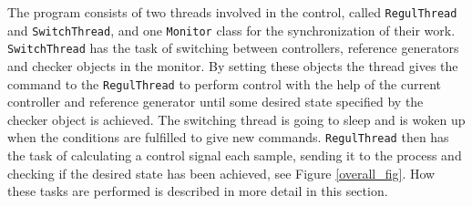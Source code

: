 


The program consists of two threads involved in the control, called \texttt{RegulThread} and \texttt{SwitchThread}, and one \texttt{Monitor} class for the synchronization of their work. 
\texttt{SwitchThread} has the task of switching between controllers, reference generators and checker objects in the monitor. By setting these objects the thread gives the command to the \texttt{RegulThread} to perform control with the help of the current controller and reference generator until some desired state specified by the checker object is achieved. The switching thread is going to sleep and is woken up when the conditions are fulfilled to give new commands.
\texttt{RegulThread} then has the task of calculating a control signal each sample, sending it to the process and checking if the desired state has been achieved, see Figure \ref{overall_fig}. How these tasks are performed is described in more detail in this section.

